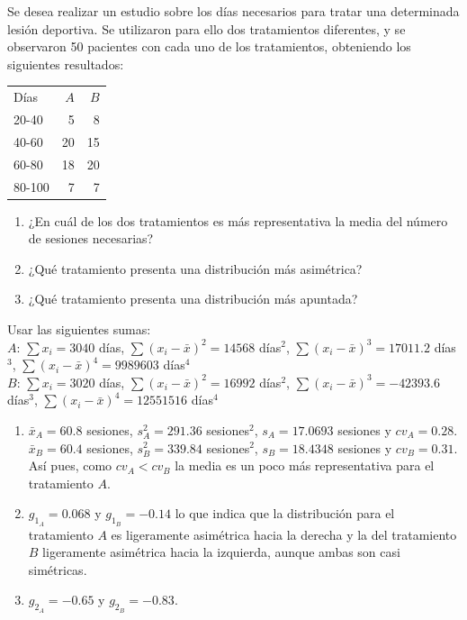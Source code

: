 {Se desea realizar un estudio sobre los días necesarios para tratar una determinada lesión deportiva.
Se utilizaron para ello dos tratamientos diferentes, y se observaron 50 pacientes con cada uno de los tratamientos, obteniendo los siguientes resultados:
\begin{center}
\begin{tabular}{lrr}
\toprule
Días & $A$ & $B$ \\
20-40 & 5 & 8 \\
40-60 & 20 & 15 \\
60-80 & 18 & 20 \\
80-100 & 7 & 7 \\
\bottomrule
\end{tabular}
\end{center}
\begin{enumerate}
\item ¿En cuál de los dos tratamientos es más representativa la media del número de sesiones necesarias?
\item ¿Qué tratamiento presenta una distribución más asimétrica?
\item ¿Qué tratamiento presenta una distribución más apuntada?
\end{enumerate}

Usar las siguientes sumas:\\
$A$: $\sum x_i= 3040$ días, $\sum (x_i-\bar x)^2=14568$ días$^2$, $\sum (x_i-\bar x)^3=17011.2$ días$^3$, $\sum
(x_i-\bar x)^4=9989603$ días$^4$\\
$B$: $\sum x_i= 3020$ días, $\sum (x_i-\bar x)^2=16992$ días$^2$, $\sum (x_i-\bar x)^3=-42393.6$ días$^3$, $\sum
(x_i-\bar x)^4=12551516$ días$^4$\\

}
{\begin{enumerate}
\item $\bar x_A=60.8$ sesiones, $s^2_A=291.36$ sesiones$^2$, $s_A=17.0693$ sesiones y $cv_A = 0.28$.\\
$\bar x_B=60.4$ sesiones, $s^2_B= 339.84$ sesiones$^2$, $s_B=18.4348$ sesiones y $cv_B = 0.31$.\\
Así pues, como $cv_A<cv_B$ la media es un poco más representativa para el tratamiento $A$. 
\item $g_{1_A} = 0.068$ y $g_{1_B} = -0.14$ lo que indica que la distribución para el tratamiento $A$ es ligeramente asimétrica hacia la derecha y la del tratamiento $B$ ligeramente asimétrica hacia la izquierda, aunque ambas son casi simétricas. 
\item $g_{2_A}= -0.65$ y $g_{2_B}= -0.83$.
\end{enumerate}
}
{}


